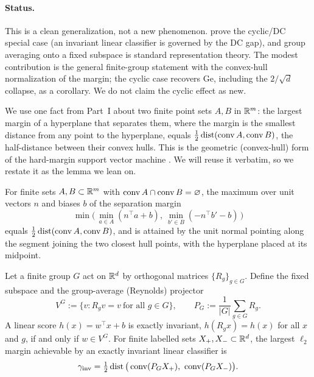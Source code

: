 \paragraph{Status.}
This is a clean generalization, not a new phenomenon. \citet{ge2021shift} prove the cyclic/DC special
case (an invariant linear classifier is governed by the DC gap), and group averaging onto a fixed
subspace is standard representation theory. The modest contribution is the general finite-group
statement with the convex-hull normalization of the margin; the cyclic case recovers Ge, including
the $2/\sqrt{d}$ collapse, as a corollary. We do not claim the cyclic effect as new.

We use one fact from Part~I about two finite point sets $A,B$ in $\mathbb{R}^m$: the largest margin of a
hyperplane that separates them, where the margin is the smallest distance from any point to the
hyperplane, equals $\tfrac12\operatorname{dist}(\operatorname{conv} A,\operatorname{conv} B)$, the half-distance between their convex hulls.
This is the geometric (convex-hull) form of the hard-margin support vector machine
\citep{bennett2000,burges1998}. We will reuse it verbatim, so we restate it as the lemma we lean on.

\begin{lemma}[Hard-margin = half convex-hull distance]
\label{lem:hull}
For finite sets $A,B \subset \mathbb{R}^m$ with $\operatorname{conv} A \cap \operatorname{conv} B = \varnothing$, the maximum over unit
vectors $n$ and biases $b$ of the separation margin
\[
  \min\big(\,\min_{a\in A}(n^\top a + b),\ \min_{b'\in B}(-n^\top b' - b)\,\big)
\]
equals $\tfrac12\operatorname{dist}(\operatorname{conv} A,\operatorname{conv} B)$, and is attained by the unit normal pointing along the
segment joining the two closest hull points, with the hyperplane placed at its midpoint.
\end{lemma}

\begin{theorem}
\label{thm:fg-margin}
Let a finite group $G$ act on $\mathbb{R}^d$ by orthogonal matrices $\{R_g\}_{g\in G}$. Define the fixed
subspace and the group-average (Reynolds) projector
\[
V^G := \{v : R_g v = v \ \text{for all } g\in G\}, \qquad
P_G := \frac{1}{|G|}\sum_{g\in G} R_g .
\]
A linear score $h(x) = w^\top x + b$ is exactly invariant, $h(R_g x) = h(x)$ for all $x$ and $g$, if
and only if $w \in V^G$. For finite labelled sets $X_+, X_- \subset \mathbb{R}^d$, the largest $\ell_2$
margin achievable by an exactly invariant linear classifier is
\[
\gamma_{\mathrm{inv}}
= \tfrac12 \operatorname{dist}\big(\operatorname{conv}(P_G X_+),\ \operatorname{conv}(P_G X_-)\big).
\]
\end{theorem}

